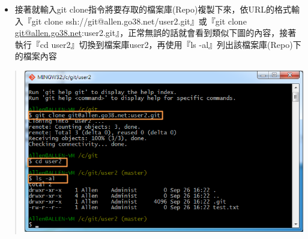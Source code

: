 \documentclass[letterpaper,10pt,english]{sphinxmanual}
\begin{document}
\begin{itemize}
\item {} 
接著就輸入git clone指令將要存取的檔案庫(Repo)複製下來，依URL的格式輸入『git clone ssh://git@allen.go38.net/user2.git』或『git clone \href{mailto:git@allen.go38.net}{git@allen.go38.net}:user2.git』，正常無誤的話就會看到類似下圖的內容，接著執行『cd user2』切換到檔案庫user2，再使用『ls -al』列出該檔案庫(Repo)下的檔案內容

\end{itemize}
\begin{quote}

\includegraphics{gitbash-clone-003.png}
\end{quote}
\end{document}
